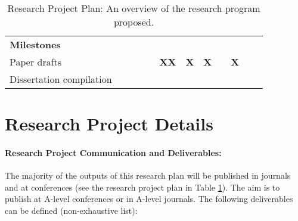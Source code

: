 \begin{table}
{\begin{tabular}{l|llclllcllll}
\textbf{Milestones}                   &                                        &                                        &                                        &                                        &                                        &                                        &                                       &                                        &                                        &                                        &                               \\
Paper drafts                          &                                        & \multicolumn{1}{c}{}                   & \textbf{}                              & \multicolumn{1}{c}{}                   & \multicolumn{1}{c}{\textbf{XX}}        & \multicolumn{1}{c}{\textbf{X}}         & \textbf{X}                            & \multicolumn{1}{c}{\textbf{} }         & \multicolumn{1}{c}{\textbf{X} }        & \multicolumn{1}{c}{\textbf{} }         & \multicolumn{1}{c|}{}         \\
Dissertation compilation              &                                        &                                        &                                        &                                        &                                        &                                        &                                       &                                        &                                        & {\cellcolor[rgb]{0.996,0,0}}           & {\cellcolor[rgb]{0.996,0,0}}  \\
\cline{2-12}
\end{tabular}%
}
\caption{Research Project Plan: An overview of the research program proposed.}
\label{researchplan}
\end{table}

\section{Research Project Details}

\paragraph{Research Project Communication and Deliverables:}
The majority of the outputs of this research plan will be published in journals and at conferences (see the research project plan in Table \ref{researchplan}). The aim is to publish at A-level conferences or in A-level journals. The following deliverables can be defined (non-exhaustive list):

